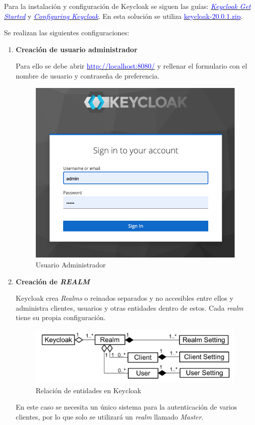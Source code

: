 Para la instalación y configuración de Keycloak se siguen las guías: \href{https://www.keycloak.org/getting-started/getting-started-zip}{\textcolor{blue}{\textit{Keycloak Get Started}}} y \href{https://www.keycloak.org/server/configuration}{\textit{\textcolor{blue}{Configuring Keycloak}}}. En esta solución se utiliza \href{https://github.com/keycloak/keycloak/releases/download/20.0.1/keycloak-20.0.1.zip}{\textcolor{blue}{keycloak-20.0.1.zip}}.

Se realizan las siguientes configuraciones:


\begin{enumerate}
	\item \textbf{Creación de usuario administrador}
	
	Para ello se debe abrir \href{http://localhost:8080/}{\textcolor{blue}{http://localhost:8080/}}
	y rellenar el formulario con el nombre de usuario y contraseña de preferencia.
	
	\begin{figure}[H]
		\centering
		\includegraphics[width=0.7\linewidth]{Graphics/admin_console}
		\caption{Usuario Administrador}
		\label{fig:adminconsole}
	\end{figure}
	
	
	\item \textbf{Creación de \textit{REALM}}
	
	Keycloak crea \textit{Realms} o reinados separados y no accesibles entre ellos y administra clientes, usuarios y otras entidades dentro de estos. Cada \textit{realm} tiene su propia configuración.
	\begin{figure}[H]
		\centering
		\includegraphics[width=0.9\linewidth]{Graphics/keycloak_realm}
		\caption{Relación de entidades en Keycloak}
		\label{fig:keycloakrealm}
	\end{figure}
	En este caso se necesita un único sistema para la autenticación de varios clientes, por lo que solo se utilizará un \textit{realm} llamado \textit{Master}.
	

\end{enumerate}
